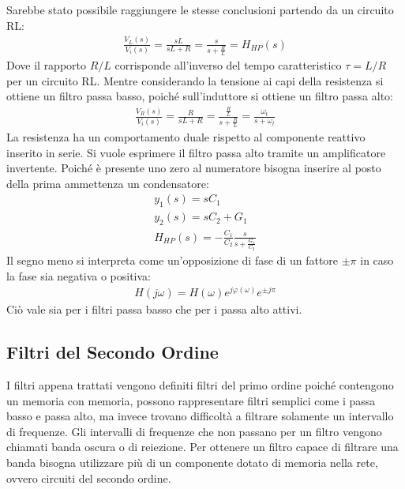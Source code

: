 \documentclass{article}
\numberwithin{equation}{subsection}
\begin{document}
Sarebbe stato possibile raggiungere le stesse conclusioni partendo da un circuito RL: 
\begin{gather*}
    \displaystyle\frac{V_L(s)}{V_i(s)}=\frac{sL}{sL+R}=\frac{s}{s+\displaystyle\frac{R}{L}}=H_{HP}(s)
\end{gather*}
Dove il rapporto $R/L$ corrisponde all'inverso del tempo caratteristico $\tau=L/R$ per un circuito RL. Mentre considerando la tensione ai capi della resistenza si ottiene 
un filtro passa basso, poiché sull'induttore si ottiene un filtro passa alto:
\begin{gather*}
    \displaystyle\frac{V_R(s)}{V_i(s)}=\frac{R}{sL+R}=\frac{\displaystyle\frac{R}{L}}{s+\displaystyle\frac{R}{L}}=\frac{\omega_t}{s+\omega_t}
\end{gather*}
La resistenza ha un comportamento duale rispetto al componente reattivo inserito in serie. 
Si vuole esprimere il filtro passa alto tramite un amplificatore invertente. Poiché è presente uno zero al numeratore bisogna inserire al posto della prima ammettenza 
un condensatore:
\begin{gather*}
    y_1(s)=sC_1\\
    y_2(s)=sC_2+G_1\\
    H_{HP}(s)=-\displaystyle\frac{C_1}{C_2}\frac{s}{s+\displaystyle\frac{G_1}{C_2}}
\end{gather*}
Il segno meno si interpreta come un'opposizione di fase di un fattore $\pm\pi$ in caso la fase sia negativa o positiva:
\begin{gather*}
    H(j\omega)=H(\omega)e^{j\varphi(\omega)}e^{\pm j\pi}
\end{gather*}
Ciò vale sia per i filtri passa basso che per i passa alto attivi. 

\subsection{Filtri del Secondo Ordine}

I filtri appena trattati vengono definiti filtri del primo ordine poiché contengono un memoria con memoria, possono rappresentare filtri semplici come i passa basso e 
passa alto, ma invece trovano difficoltà a filtrare solamente un intervallo di frequenze. Gli intervalli di frequenze che non passano per un filtro vengono chiamati 
banda oscura o di reiezione. Per ottenere un filtro capace di filtrare una banda bisogna utilizzare più di un componente dotato di memoria nella rete, ovvero circuiti del 
secondo ordine. 
\end{document}
